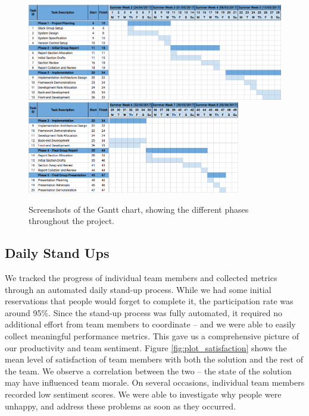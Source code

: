 \begin{figure}[h!]
	\includegraphics[width=\textwidth]{images/gantt_chart1}
	\vspace{0.1cm}\newline
	\includegraphics[width=0.83\textwidth]{images/gantt_chart2}
	\caption{Screenshots of the Gantt chart, showing the different phases throughout the project.}
	\label{fig:gantt_chart}
\end{figure}


\subsection{Daily Stand Ups}
\label{sec:standups}
We tracked the progress of individual team members and collected metrics through an automated daily stand-up process. While we had some initial reservations that people would forget to complete it, the participation rate was around 95\%.  Since the stand-up process was fully automated, it required no additional effort from team members to coordinate -- and we were able to easily collect meaningful performance metrics. This gave us a comprehensive picture of our productivity and team sentiment. Figure \ref{fig:plot_satisfaction} shows the mean level of satisfaction of team members with both the solution and the rest of the team. We observe a correlation between the two -- the state of the solution may have influenced team morale. On several occasions, individual team members recorded low sentiment scores. We were able to investigate why people were unhappy, and address these problems as soon as they occurred.

